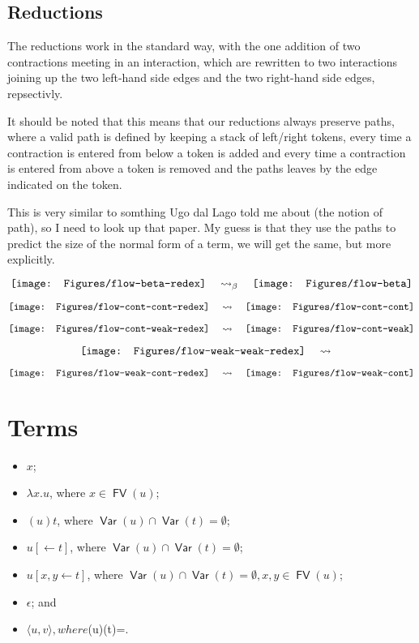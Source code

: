 \documentclass[11pt,a4paper]{article}
\theoremstyle{definition}
\theoremstyle{plain}
\theoremstyle{remark}
\begin{document}
\subsection{Reductions}

The reductions work in the standard way, with the one addition of two contractions meeting in an interaction, which are rewritten to two interactions joining up the two left-hand side edges and the two right-hand side edges, repsectivly.

It should be noted that this means that our reductions always preserve paths, where a valid path is defined by keeping a stack of left/right tokens, every time a contraction is entered from below a token is added and every time a contraction is entered from above a token is removed and the paths leaves by the edge indicated on the token.

This is very similar to somthing Ugo dal Lago told me about (the notion of path), so I need to look up that paper. My guess is that they use the paths to predict the size of the normal form of a term, we will get the same, but more explicitly.

\[
\vcenter{\hbox{\texttt{[image: Figures/flow-beta-redex]}}}
\quad\rightsquigarrow_\beta\quad
\vcenter{\hbox{\texttt{[image: Figures/flow-beta]}}}
\]

\[
\vcenter{\hbox{\texttt{[image: Figures/flow-cont-cont-redex]}}}
\quad\rightsquigarrow\quad
\vcenter{\hbox{\texttt{[image: Figures/flow-cont-cont]}}}
\]

\[
\vcenter{\hbox{\texttt{[image: Figures/flow-cont-weak-redex]}}}
\quad\rightsquigarrow\quad
\vcenter{\hbox{\texttt{[image: Figures/flow-cont-weak]}}}
\]

\[
\vcenter{\hbox{\texttt{[image: Figures/flow-weak-weak-redex]}}}
\quad\rightsquigarrow\quad
\]

\[
\vcenter{\hbox{\texttt{[image: Figures/flow-weak-cont-redex]}}}
\quad\rightsquigarrow\quad
\vcenter{\hbox{\texttt{[image: Figures/flow-weak-cont]}}}
\]

\section{Terms}

\newcommand{\FV}{{\mathop{\mathsf{FV}}}}
\newcommand{\Var}{{\mathop{\mathsf{Var}}}}

\begin{itemize}
\item $x$;
\item $\lambda x.u$, where $x\in\FV(u)$;
\item $(u)t$, where $\Var(u)\cap\Var(t)=\emptyset$;
\item $u[\leftarrow t]$, where $\Var(u)\cap\Var(t)=\emptyset$;
\item $u[x,y\leftarrow t]$, where $\Var(u)\cap\Var(t)=\emptyset, x,y\in\FV(u)$;
\item $\epsilon$; and
\item $\langle u,v\rangle, where $\Var(u)\cap\Var(t)=\emptyset.
\end{itemize}
\end{document}
